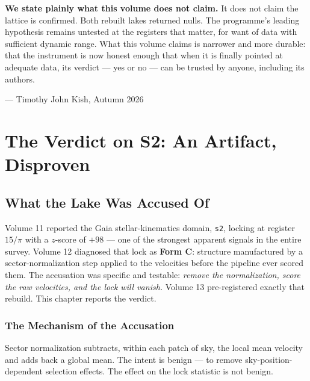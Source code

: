 \documentclass[11pt, letterpaper, openany]{book}
\begin{document}
\begin{warningbox}
\textbf{We state plainly what this volume does not claim.} It does not claim the lattice is
confirmed. Both rebuilt lakes returned nulls. The programme's leading hypothesis remains
untested at the registers that matter, for want of data with sufficient dynamic range. What
this volume claims is narrower and more durable: that the instrument is now honest enough that
when it is finally pointed at adequate data, its verdict --- yes or no --- can be trusted by
anyone, including its authors.
\end{warningbox}

\vspace{1em}
\noindent\hfill --- Timothy John Kish, Autumn 2026

\chapter{The Verdict on S2: An Artifact, Disproven}

\section{What the Lake Was Accused Of}

Volume 11 reported the Gaia stellar-kinematics domain, \texttt{s2}, locking at register
$15/\pi$ with a $z$-score of $+98$ --- one of the strongest apparent signals in the entire
survey. Volume 12 diagnosed that lock as \textbf{Form C}: structure manufactured by a
sector-normalization step applied to the velocities before the pipeline ever scored them. The
accusation was specific and testable: \emph{remove the normalization, score the raw velocities,
and the lock will vanish.} Volume 13 pre-registered exactly that rebuild. This chapter reports
the verdict.

\subsection{The Mechanism of the Accusation}

Sector normalization subtracts, within each patch of sky, the local mean velocity and adds back
a global mean. The intent is benign --- to remove sky-position-dependent selection effects. The
effect on the lock statistic is not benign.
\end{document}
